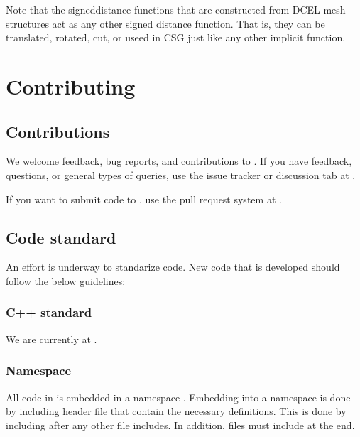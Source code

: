 \documentclass[letterpaper,10pt,english]{sphinxmanual}
\begin{document}
Note that the signed\sphinxhyphen{}distance functions that are constructed from DCEL mesh structures act  as any other signed distance function.
That is, they can be translated, rotated, cut, or useed in CSG just like any other implicit function.


\chapter{Contributing}
\label{\detokenize{index:contributing}}

\section{Contributions}
\label{\detokenize{Contrib/Contributions:contributions}}\label{\detokenize{Contrib/Contributions:chap-contributions}}\label{\detokenize{Contrib/Contributions::doc}}
We welcome feedback, bug reports, and contributions to .
If you have feedback, questions, or general types of queries, use the issue tracker or discussion tab at .

If you want to submit code to , use the pull request system at .


\section{Code standard}
\label{\detokenize{Contrib/CodeStandard:code-standard}}\label{\detokenize{Contrib/CodeStandard:chap-codestandard}}\label{\detokenize{Contrib/CodeStandard::doc}}
An effort is underway to standarize  code.
New code that is developed should follow the below guidelines:


\subsection{C++ standard}
\label{\detokenize{Contrib/CodeStandard:c-standard}}
We are currently at .


\subsection{Namespace}
\label{\detokenize{Contrib/CodeStandard:namespace}}
All code in  is embedded in a namespace .
Embedding into a namespace is done by including header file  that contain the necessary definitions.
This is done by including after any other file includes.
In addition, files must include  at the end.
\end{document}
